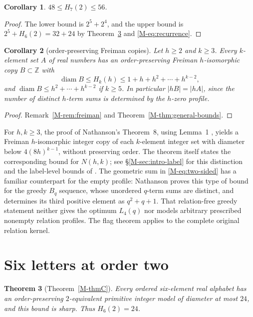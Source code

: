 \documentclass[11pt,reqno]{amsart}
\theoremstyle{plain}
\newtheorem{theorem}{Theorem}[section]
\newtheorem{corollary}[theorem]{Corollary}
\theoremstyle{definition}
\theoremstyle{plain}
\newcommand{\Z}{\mathbb{Z}}
\newcommand{\diam}{\operatorname{diam}}
\theoremstyle{plain}
\theoremstyle{plain}
\theoremstyle{plain}
\theoremstyle{plain}
\theoremstyle{plain}
\theoremstyle{definition}
\theoremstyle{definition}
\theoremstyle{definition}
\theoremstyle{plain}
\begin{document}
\begin{corollary}\label{M-cor:seven-two}
$48\le H_7(2)\le56$.
\end{corollary}
\begin{proof}
The lower bound is $2^5+2^4$, and the upper bound is $2^5+H_6(2)=32+24$ by
Theorem~\ref{M-thm:six-two} and \eqref{M-eq:recurrence}.
\end{proof}

\begin{corollary}[order-preserving Freiman copies]\label{M-cor:label}
Let $h\ge2$ and $k\ge3$. Every $k$-element set $A$ of real numbers has an
order-preserving Freiman $h$-isomorphic copy $B\subset\Z$ with
\[
 \diam B\le H_k(h)\le 1+h+h^2+\cdots+h^{k-2},
\]
and $\diam B\le h^2+\cdots+h^{k-2}$ if $k\ge5$. In particular
$|hB|=|hA|$, since the number of distinct $h$-term sums is determined by the
$h$-zero profile.
\end{corollary}
\begin{proof}
Remark~\ref{M-rem:freiman} and Theorem~\ref{M-thm:general-bounds}.
\end{proof}

For $h,k\ge3$, the proof of Nathanson's Theorem~8, using Lemma~1
\cite{M-Nat26}, yields a Freiman $h$-isomorphic integer copy of each
$k$-element integer set with diameter below $4(8h)^{k-1}$, without
preserving order. The theorem itself states the corresponding bound for
$N(h,k)$; see \S\ref{M-sec:intro-label} for this distinction and the
label-level bounds of \cite{M-Shin26}. The geometric sum in
\eqref{M-eq:two-sided} has a familiar counterpart for the empty profile:
Nathanson \cite{M-Nathanson25} proves this type of bound for the greedy $B_q$
sequence, whose unordered $q$-term sums are distinct, and determines its
third positive element as $q^2+q+1$. That relation-free greedy statement
neither gives the optimum $L_4(q)$ nor models arbitrary prescribed nonempty
relation profiles. The flag theorem applies to the complete original
relation kernel.

\section{Six letters at order two}\label{M-sec:six}

\begin{theorem}[Theorem~\ref{M-thmC}]\label{M-thm:six-two}
Every ordered six-element real alphabet has an order-preserving
$2$-equivalent primitive integer model of diameter at most $24$, and this
bound is sharp. Thus $H_6(2)=24$.
\end{theorem}
\end{document}

